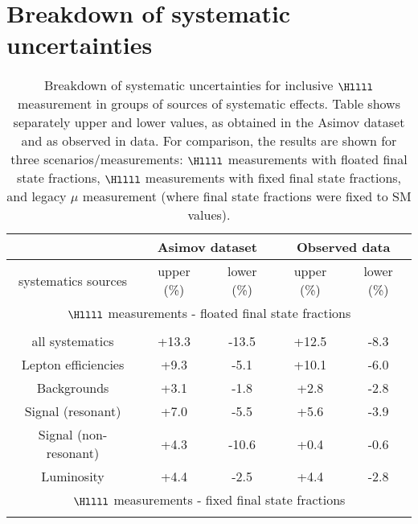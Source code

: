 \section{Breakdown of systematic uncertainties}

\begin{table}[htbp]
      \caption{
Breakdown of systematic uncertainties for inclusive $\Hllll$ measurement in groups of sources of systematic effects. Table shows separately upper and lower values, as obtained in the Asimov dataset and as observed in data. For comparison, the results are shown for three scenarios/measurements: $\Hllll$ measurements with floated final state fractions, $\Hllll$ measurements with fixed final state fractions, and legacy $\mu$ measurement (where final state fractions were fixed to SM values).
 \label{tab:massesInclusive_results}
        }
\begin{tabular}{|c|c|c|c|c|}
\hline %
\hline %
 & \multicolumn{2}{|c|}{Asimov dataset} &  \multicolumn{2}{|c|}{ Observed data} \\
\hline %
systematics sources & upper (\%) & lower (\%) & upper (\%) & lower (\%)  \\
\hline %
\multicolumn{5}{|c|}{$\Hllll$ measurements - floated final state fractions} \\
\hline %
\vspace{-0.4cm} &&&&\\
all systematics
& +13.3 & -13.5 
& +12.5 & -8.3 \\
Lepton efficiencies
& +9.3 & -5.1 
& +10.1 & -6.0 \\
Backgrounds
& +3.1 & -1.8 
& +2.8 & -2.8 \\
Signal (resonant)
& +7.0 & -5.5 
& +5.6 & -3.9 \\
Signal (non-resonant) 
& +4.3 & -10.6 
& +0.4 & -0.6 \\
Luminosity
& +4.4 & -2.5 
& +4.4 & -2.8 \\
\hline %
\multicolumn{5}{|c|}{$\Hllll$ measurements - fixed final state fractions} \\
\hline %
\vspace{-0.4cm} &&&&\\

\end{tabular}
\end{table}
